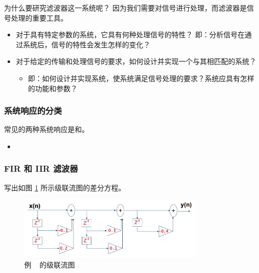 \begin{remark}
    为什么要研究滤波器这一系统呢？
    因为我们需要对信号进行处理，而滤波器是信号处理的重要工具。
    \begin{itemize}
        \item 对于具有特定参数的系统，它具有何种处理信号的特性？
            \subitem 即：分析信号在通过系统后，信号的特性会发生怎样的变化？
        \item 对于给定的传输和处理信号的要求，如何设计并实现一个与其相匹配的系统？
            \begin{itemize}
                \item 即：如何设计并实现系统，使系统满足信号处理的要求？系统应具有怎样的功能和参数？
            \end{itemize}
    \end{itemize}
\end{remark}
\begin{example}[系统的描述方法]
    
\end{example}

\subsubsection{系统响应的分类}

\begin{example}[]
    常见的两种系统响应是和。
    \begin{itemize}
        \item 
    \end{itemize}

\end{example}

\subsubsection{FIR 和 IIR 滤波器}

\begin{example}
    \label{exercise:serial-flow-chart}
    写出如图 \ref{fig:serial-flow-chart} 所示级联流图的差分方程。
    \begin{figure}[H]
        \centering
        \includegraphics[width=0.8\textwidth]{chap4/img/serial_flow_chart.png}
        \caption{例 \theexample~ 的级联流图}
        \label{fig:serial-flow-chart}
    \end{figure}
\end{example}

